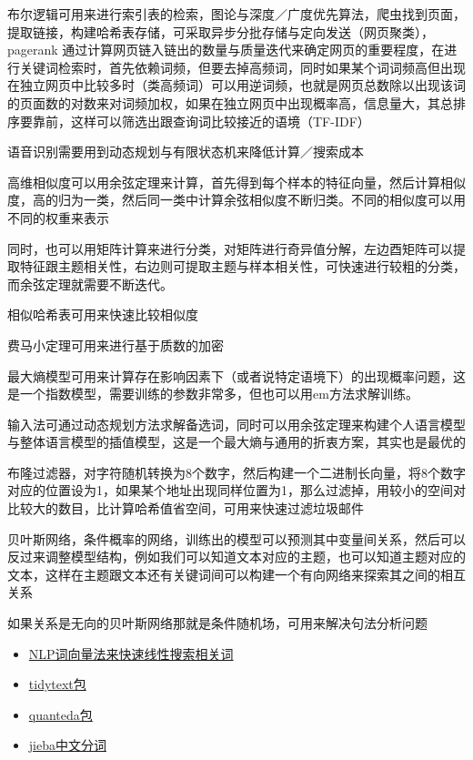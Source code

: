 \documentclass[
]{book}
\providecommand{\tightlist}{%
  \setlength{\itemsep}{0pt}\setlength{\parskip}{0pt}}
\begin{document}
布尔逻辑可用来进行索引表的检索，图论与深度／广度优先算法，爬虫找到页面，提取链接，构建哈希表存储，可采取异步分批存储与定向发送（网页聚类），pagerank 通过计算网页链入链出的数量与质量迭代来确定网页的重要程度，在进行关键词检索时，首先依赖词频，但要去掉高频词，同时如果某个词词频高但出现在独立网页中比较多时（类高频词）可以用逆词频，也就是网页总数除以出现该词的页面数的对数来对词频加权，如果在独立网页中出现概率高，信息量大，其总排序要靠前，这样可以筛选出跟查询词比较接近的语境（TF-IDF）

语音识别需要用到动态规划与有限状态机来降低计算／搜索成本

高维相似度可以用余弦定理来计算，首先得到每个样本的特征向量，然后计算相似度，高的归为一类，然后同一类中计算余弦相似度不断归类。不同的相似度可以用不同的权重来表示

同时，也可以用矩阵计算来进行分类，对矩阵进行奇异值分解，左边酉矩阵可以提取特征跟主题相关性，右边则可提取主题与样本相关性，可快速进行较粗的分类，而余弦定理就需要不断迭代。

相似哈希表可用来快速比较相似度

费马小定理可用来进行基于质数的加密

最大熵模型可用来计算存在影响因素下（或者说特定语境下）的出现概率问题，这是一个指数模型，需要训练的参数非常多，但也可以用em方法求解训练。

输入法可通过动态规划方法求解备选词，同时可以用余弦定理来构建个人语言模型与整体语言模型的插值模型，这是一个最大熵与通用的折衷方案，其实也是最优的

布隆过滤器，对字符随机转换为8个数字，然后构建一个二进制长向量，将8个数字对应的位置设为1，如果某个地址出现同样位置为1，那么过滤掉，用较小的空间对比较大的数目，比计算哈希值省空间，可用来快速过滤垃圾邮件

贝叶斯网络，条件概率的网络，训练出的模型可以预测其中变量间关系，然后可以反过来调整模型结构，例如我们可以知道文本对应的主题，也可以知道主题对应的文本，这样在主题跟文本还有关键词间可以构建一个有向网络来探索其之间的相互关系

如果关系是无向的贝叶斯网络那就是条件随机场，可用来解决句法分析问题

\begin{itemize}
\tightlist
\item
  \href{https://juliasilge.com/blog/tidy-word-vectors/}{NLP词向量法来快速线性搜索相关词}
\item
  \href{https://cran.r-project.org/web/packages/tidytext/vignettes/tidytext.html}{tidytext包}
\item
  \href{http://docs.quanteda.io/index.html}{quanteda包}
\item
  \href{https://github.com/qinwf/jiebaR}{jieba中文分词}
\end{itemize}
\end{document}
